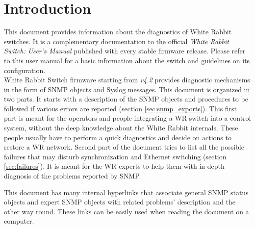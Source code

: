 \section{Introduction}

This document provides information about the diagnostics of White Rabbit
switches. It is a complementary documentation to the official \emph{White Rabbit
Switch: User's Manual} published with every stable firmware release. Please
refer to this user manual for a basic information about the switch and
guidelines on its configuration.\\

White Rabbit Switch firmware starting from \emph{v4.2} provides diagnostic
mechanisms in the form of SNMP objects and Syslog messages. This document is
organized in two parts. It starts with a description of the SNMP objects and
procedures to be followed if various errors are reported (section
\ref{sec:snmp_exports}). This first part is meant for the operators and people
integrating a WR switch into a control system, without the deep knowledge about
the White Rabbit internals. These people usually have to perform a quick
diagnostics and decide on actions to restore a WR network.
Second part of the document tries to list all the possible failures
that may disturb synchronization and Ethernet switching (section
\ref{sec:failures}). It is meant for the WR experts to help them with in-depth
diagnosis of the problems reported by SNMP.

This document has many internal hyperlinks that associate general SNMP status
objects and expert SNMP objects with related problems' description and the other
way round. These links can be easily used when reading the document on a
computer.
